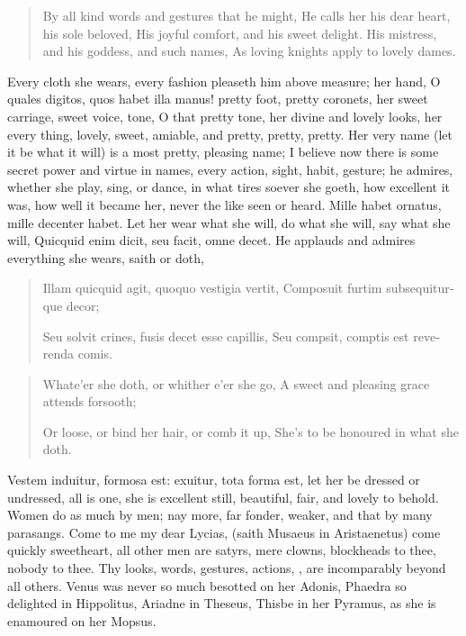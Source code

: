 \begin{verse}%
By all kind words and gestures that he might,
He calls her his dear heart, his sole beloved,
His joyful comfort, and his sweet delight.
His mistress, and his goddess, and such names,
As loving knights apply to lovely dames.
\end{verse}%

Every cloth she wears, every fashion pleaseth him above measure; her
hand, O quales digitos, quos habet illa manus! pretty foot, pretty
coronets, her sweet carriage, sweet voice, tone, O that pretty tone,
her divine and lovely looks, her every thing, lovely, sweet, amiable,
and pretty, pretty, pretty. Her very name (let it be what it will) is a
most pretty, pleasing name; I believe now there is some secret power
and virtue in names, every action, sight, habit, gesture; he admires,
whether she play, sing, or dance, in what tires soever she goeth, how
excellent it was, how well it became her, never the like seen or heard.
Mille habet ornatus, mille decenter habet. Let her wear what she
will, do what she will, say what she will, Quicquid enim dicit,
seu facit, omne decet. He applauds and admires everything she wears,
saith or doth,

\begin{latin}
\begin{verse}
Illam quicquid agit, quoquo vestigia vertit,
Composuit furtim subsequiturque decor;

Seu solvit crines, fusis decet esse capillis,
Seu compsit, comptis est reverenda comis.
\end{verse}
\end{latin}
\translationrule%
\begin{verse}%
Whate'er she doth, or whither e'er she go,
A sweet and pleasing grace attends forsooth;

Or loose, or bind her hair, or comb it up,
She's to be honoured in what she doth.
\end{verse}%

Vestem induitur, formosa est: exuitur, tota forma est, let her be
dressed or undressed, all is one, she is excellent still, beautiful,
fair, and lovely to behold. Women do as much by men; nay more, far
fonder, weaker, and that by many parasangs. Come to me my dear Lycias,
(saith Musaeus in Aristaenetus) come quickly sweetheart, all
other men are satyrs, mere clowns, blockheads to thee, nobody to thee.
Thy looks, words, gestures, actions, \etc{}, are incomparably beyond all
others. Venus was never so much besotted on her Adonis, Phaedra so
delighted in Hippolitus, Ariadne in Theseus, Thisbe in her Pyramus, as
she is enamoured on her Mopsus.

